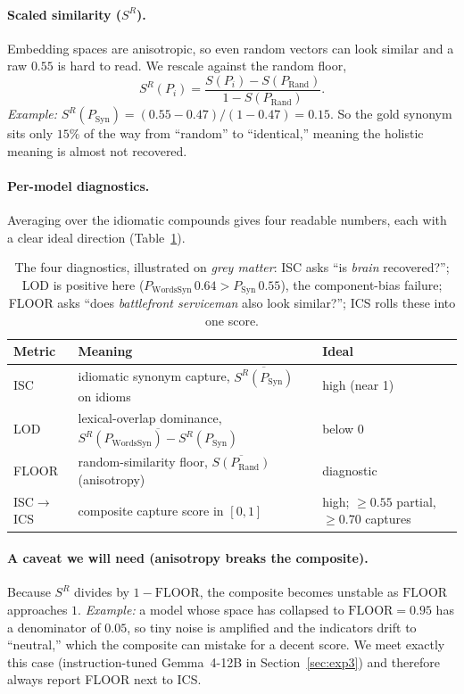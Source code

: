 \documentclass[11pt]{article}
\newcommand{\Syn}{P_{\mathrm{Syn}}}
\newcommand{\Words}{P_{\mathrm{WordsSyn}}}
\newcommand{\Rand}{P_{\mathrm{Rand}}}
\begin{document}
\paragraph{Scaled similarity ($S^R$).} Embedding spaces are anisotropic, so even random vectors can
look similar and a raw $0.55$ is hard to read. We rescale against the random floor,
\[
S^R(P_i) = \frac{S(P_i)-S(\Rand)}{\,1-S(\Rand)\,}.
\]
\emph{Example:} $S^R(\Syn)=(0.55-0.47)/(1-0.47)=0.15$. So the gold synonym sits only $15\%$ of the
way from ``random'' to ``identical,'' meaning the holistic meaning is almost not recovered.

\paragraph{Per-model diagnostics.} Averaging over the idiomatic compounds gives four readable
numbers, each with a clear ideal direction (Table~\ref{tab:metricdef}).

\begin{table}[H]
\centering
\small
\begin{tabular}{lll}
\toprule
Metric & Meaning & Ideal \\
\midrule
ISC & idiomatic synonym capture, $\overline{S^R(\Syn)}$ on idioms & high (near 1) \\
LOD & lexical-overlap dominance, $\overline{S^R(\Words)-S^R(\Syn)}$ & below 0 \\
FLOOR & random-similarity floor, $\overline{S(\Rand)}$ (anisotropy) & diagnostic \\
ISC$\to$ICS & composite capture score in $[0,1]$ & high; $\ge0.55$ partial, $\ge0.70$ captures \\
\bottomrule
\end{tabular}
\caption{The four diagnostics, illustrated on \emph{grey matter}: ISC asks ``is \emph{brain}
recovered?''; LOD is positive here ($\Words\,0.64 > \Syn\,0.55$), the component-bias failure; FLOOR
asks ``does \emph{battlefront serviceman} also look similar?''; ICS rolls these into one score.}
\label{tab:metricdef}
\end{table}

\paragraph{A caveat we will need (anisotropy breaks the composite).} Because $S^R$ divides by
$1-\mathrm{FLOOR}$, the composite becomes unstable as $\mathrm{FLOOR}$ approaches $1$. \emph{Example:}
a model whose space has collapsed to $\mathrm{FLOOR}=0.95$ has a denominator of $0.05$, so tiny
noise is amplified and the indicators drift to ``neutral,'' which the composite can mistake for a
decent score. We meet exactly this case (instruction-tuned Gemma~4-12B in Section~\ref{sec:exp3})
and therefore always report FLOOR next to ICS.
\end{document}
